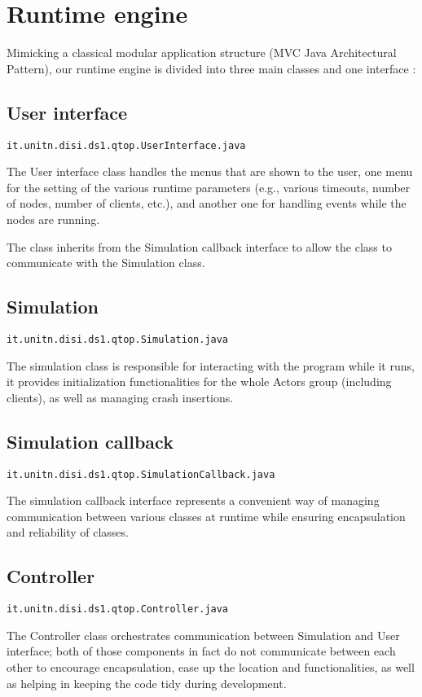 \section{Runtime engine}

Mimicking a classical modular application structure (MVC Java Architectural Pattern), our runtime engine is divided into three main classes and one interface :
\subsection{User interface}
\texttt{it.unitn.disi.ds1.qtop.UserInterface.java}

The User interface class handles the menus that are shown to the user, one menu for the setting of the various runtime parameters (e.g., various timeouts, number of nodes, number of clients, etc.), and another one for handling events while the nodes are running.

The class inherits from the Simulation callback interface to allow the class to communicate with the Simulation class.

\subsection{Simulation}
\texttt{it.unitn.disi.ds1.qtop.Simulation.java}

The simulation class is responsible for interacting with the program while it runs, it provides initialization functionalities for the whole Actors group (including clients), as well as managing crash insertions.


\subsection{Simulation callback}
\texttt{it.unitn.disi.ds1.qtop.SimulationCallback.java}

The simulation callback interface represents a convenient way of managing communication between various classes at runtime while ensuring encapsulation and reliability of classes. 


\subsection{Controller}
\texttt{it.unitn.disi.ds1.qtop.Controller.java}

The Controller class orchestrates communication between Simulation and User interface; both of those components in fact do not communicate between each other to encourage encapsulation, ease up the location and functionalities, as well as helping in keeping the code tidy during development.



